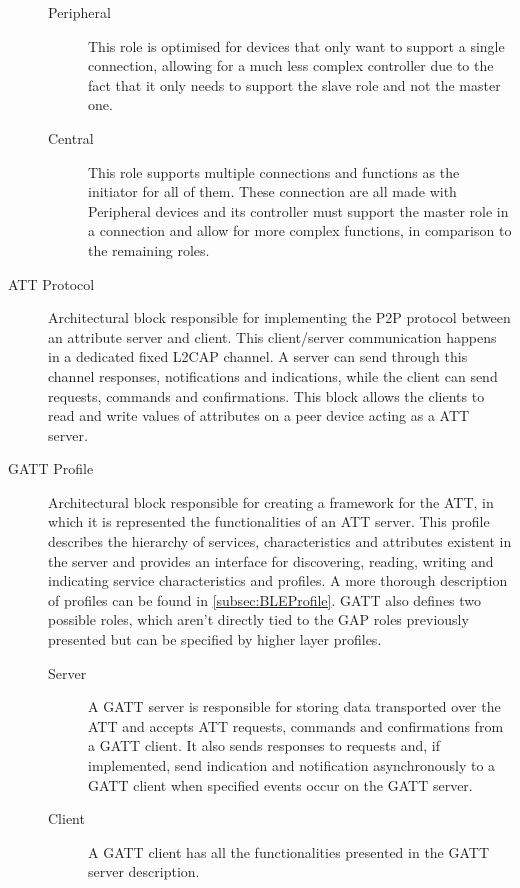 \begin{description}
\begin{description}
	\item[Peripheral] This role is optimised for devices that only want to support a single connection, allowing for a much less complex controller due to the fact that it only needs to support the slave role and not the master one.


	\item[Central] This role supports multiple connections and functions as the initiator for all of them. These connection are all made with Peripheral devices and its controller must support the master role in a connection and allow for more complex functions, in comparison to the remaining roles.
\end{description}

\item[\ac{ATT} Protocol] Architectural block responsible for implementing the \ac{P2P} protocol between an attribute server and client. This client/server communication happens in a dedicated fixed \ac{L2CAP} channel. A server can send through this channel responses, notifications and indications, while the client can send requests, commands and confirmations. This block allows the clients to read and write values of attributes on a peer device acting as a \ac{ATT} server.


\item[\ac{GATT} Profile] Architectural block responsible for creating a framework for the \ac{ATT}, in which it is represented the functionalities of an \ac{ATT} server. This profile describes the hierarchy of services, characteristics and attributes existent in the server and provides an interface for discovering, reading, writing and indicating service characteristics and profiles. A more thorough description of profiles can be found in \ref{subsec:BLEProfile}. \ac{GATT} also defines two possible roles, which aren't directly tied to the \ac{GAP} roles previously presented but can be specified by higher layer profiles.
\begin{description}
	\item[]

	\item[Server] A \ac{GATT} server is responsible for storing data transported over the \ac{ATT} and accepts \ac{ATT} requests, commands and confirmations from a \ac{GATT} client. It also sends responses to requests and, if implemented, send indication and notification asynchronously to a \ac{GATT} client when specified events occur on the \ac{GATT} server.
 
	\item[Client] A \ac{GATT} client has all the functionalities presented in the \ac{GATT} server description.
\end{description}

\end{description}


